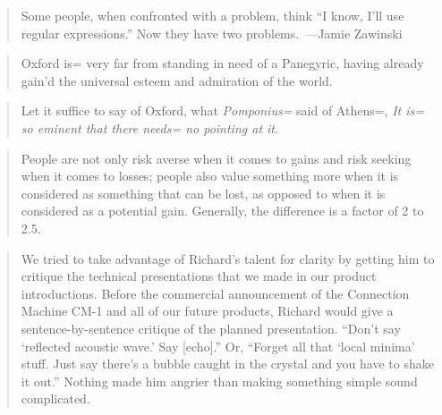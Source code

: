 \documentclass[a4paper]{article}
\begin{document}
\medskip
\begin{quote}
	Some people, when confronted with a problem, think ``I know, I'll
	use regular expressions.'' Now they have two problems.~---Jamie Zawinski~\cite{Zawinski1997}
\end{quote}

%
%
%

\medskip
\begin{quote}
	\selectfont
	Oxford is= very far from standing in need of a Panegyric, having
	already gain'd the universal esteem and admiration of the
	world.~\cite{Camden1695}
\end{quote}

\medskip
\begin{quote}
	\selectfont
	Let it suffice to say of Oxford, what \emph{Pomponius=} said
	of Athens=, \emph{It is= so eminent that there needs= no pointing
	at it}.~\cite{Camden1695}
\end{quote}

\medskip
\begin{quote}
	People are not only risk averse when it comes to gains and risk
	seeking when it comes to losses; people also value something more
	when it is considered as something that can be lost, as opposed
	to when it is considered as a potential gain.  Generally, the
	difference is a factor of 2 to 2.5.~\cite{Schneier2008}
\end{quote}

\medskip
\begin{quote}
	We tried to take advantage of Richard's talent for clarity by getting
	him to critique the technical presentations that we made in our
	product introductions. Before the commercial announcement of the
	Connection Machine CM-1 and all of our future products, Richard
	would give a sentence-by-sentence critique of the planned presentation.
	``Don't say `reflected acoustic wave.' Say [echo].'' Or, ``Forget all
	that `local minima' stuff. Just say there's a bubble caught in the
	crystal and you have to shake it out.'' Nothing made him angrier
	than making something simple sound complicated.~\cite{Hillis1989}
\end{quote}
\end{document}
